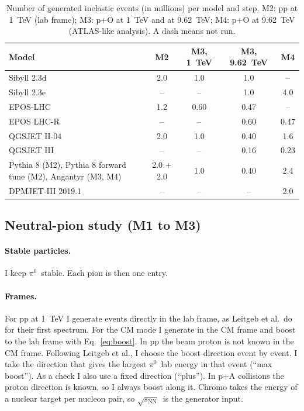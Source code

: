 \documentclass[11pt,a4paper]{article}
\newcommand{\pizero}{\ensuremath{\pi^{0}}}
\newcommand{\sNN}{\ensuremath{\sqrt{s_{\mathrm{NN}}}}}
\begin{document}
\begin{table}[!htbp]
\centering
\small
\caption{Number of generated inelastic events (in millions) per model and step. M2: pp at 1~TeV (lab frame); M3: p+O at 1~TeV and at 9.62~TeV; M4: p+O at 9.62~TeV (ATLAS-like analysis). A dash means not run.}
\label{tab:stats}
\begin{tabular}{@{}lcccc@{}}
\toprule
Model & M2 & M3, 1~TeV & M3, 9.62~TeV & M4\\
\midrule
Sibyll 2.3d & 2.0 & 1.0 & 1.0 & --\\
Sibyll 2.3e & -- & -- & 1.0 & 4.0\\
EPOS-LHC & 1.2 & 0.60 & 0.47 & --\\
EPOS LHC-R & -- & -- & 0.60 & 0.47\\
QGSJET II-04 & 2.0 & 1.0 & 0.40 & 1.6\\
QGSJET III & -- & -- & 0.16 & 0.23\\
Pythia 8 (M2), Pythia 8 forward tune (M2), Angantyr (M3, M4) & 2.0 + 2.0 & 1.0 & 0.40 & 2.4\\
DPMJET-III 2019.1 & -- & -- & -- & 2.0\\
\bottomrule
\end{tabular}
\end{table}

\subsection{Neutral-pion study (M1 to M3)}
\label{sec:pi0study}
\paragraph{Stable particles.}
I keep \pizero\ stable. Each pion is then one entry.

\paragraph{Frames.}
For pp at 1~TeV I generate events directly in the lab frame, as Leitgeb et al.\ do for their first spectrum.
For the CM mode I generate in the CM frame and boost to the lab frame with Eq.~\eqref{eq:boost}.
In pp the beam proton is not known in the CM frame.
Following Leitgeb et al., I choose the boost direction event by event.
I take the direction that gives the largest \pizero\ lab energy in that event (``max boost'').
As a check I also use a fixed direction (``plus'').
In p+A collisions the proton direction is known, so I always boost along it.
Chromo takes the energy of a nuclear target per nucleon pair, so \sNN\ is the generator input.
\end{document}

